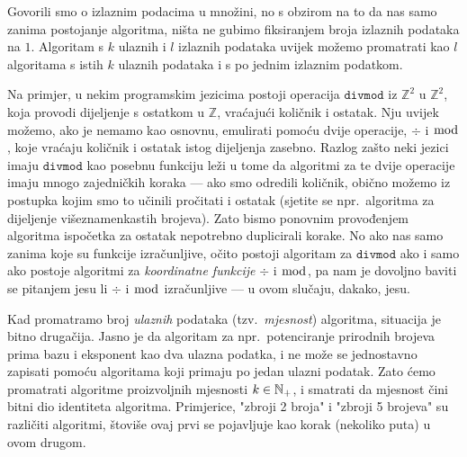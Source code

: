 
\begin{napomena}[{name=[samo jedan izlazni podatak]}]\label{nap:brip}
Govorili smo o izlaznim podacima u množini, no s obzirom na to da nas samo zanima postojanje algoritma, ništa ne gubimo fiksiranjem broja izlaznih podataka na $1$. Algoritam s $k$ ulaznih i $l$ izlaznih podataka uvijek možemo promatrati kao $l$ algoritama s istih $k$ ulaznih podataka i s po jednim izlaznim podatkom.

    Na primjer, u nekim programskim jezicima postoji operacija $\texttt{divmod}$ iz $\mathbb Z^2$ u $\mathbb Z^2$, koja provodi dijeljenje s ostatkom u $\mathbb Z$, vraćajući količnik i ostatak. Nju uvijek možemo, ako je nemamo kao osnovnu, emulirati pomoću dvije operacije, $\div$ i $\bmod$, koje vraćaju količnik i ostatak istog dijeljenja zasebno. Razlog zašto neki jezici imaju $\texttt{divmod}$ kao posebnu funkciju leži u tome da algoritmi za te dvije operacije imaju mnogo zajedničkih koraka --- ako smo odredili količnik, obično možemo iz postupka kojim smo to učinili pročitati i ostatak (sjetite se npr.\ algoritma za dijeljenje višeznamenkastih brojeva). Zato bismo ponovnim provođenjem algoritma ispočetka za ostatak nepotrebno duplicirali korake. No ako nas samo zanima koje su funkcije izračunljive, očito postoji algoritam za $\texttt{divmod}$ ako i samo ako postoje algoritmi za \emph{koordinatne funkcije} $\div$ i $\bmod$, pa nam je dovoljno baviti se pitanjem jesu li $\div$ i $\bmod$ izračunljive --- u ovom slučaju, dakako, jesu.
\end{napomena}

Kad promatramo broj \emph{ulaznih} podataka (tzv.\ \emph{mjesnost}) algoritma, situacija je bitno drugačija. Jasno je da algoritam za npr.\ potenciranje prirodnih brojeva prima bazu i eksponent kao dva ulazna podatka, i ne može se jednostavno zapisati pomoću algoritama koji primaju po jedan ulazni podatak. %
Zato ćemo promatrati algoritme proizvoljnih mjesnosti $k\in{\mathbb N}_+$, i smatrati da mjesnost čini bitni dio identiteta algoritma. Primjerice, "zbroji 2 broja" i "zbroji 5 brojeva" su različiti algoritmi, štoviše ovaj prvi se pojavljuje kao korak (nekoliko puta) u ovom drugom.

